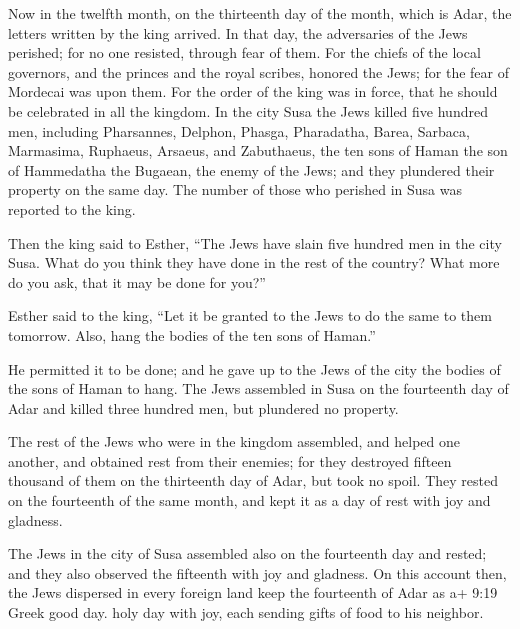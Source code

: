  Now in the twelfth month, on the thirteenth day of the
month, which is Adar, the letters written by the king arrived.
 In that day, the adversaries of the Jews perished; for no
one resisted, through fear of them.  For the chiefs of the
local governors, and the princes and the royal scribes, honored the
Jews; for the fear of Mordecai was upon them.  For the order
of the king was in force, that he should be celebrated in all the
kingdom.  In the city Susa the Jews killed five hundred men,
 including Pharsannes, Delphon, Phasga, 
Pharadatha, Barea, Sarbaca,  Marmasima, Ruphaeus, Arsaeus,
and Zabuthaeus,  the ten sons of Haman the son of
Hammedatha the Bugaean, the enemy of the Jews; and they plundered their
property on the same day.  The number of those who perished
in Susa was reported to the king.

 Then the king said to Esther, ``The Jews have slain five
hundred men in the city Susa. What do you think they have done in the
rest of the country? What more do you ask, that it may be done for
you?''

 Esther said to the king, ``Let it be granted to the Jews
to do the same to them tomorrow. Also, hang the bodies of the ten sons
of Haman.''

 He permitted it to be done; and he gave up to the Jews of
the city the bodies of the sons of Haman to hang.  The Jews
assembled in Susa on the fourteenth day of Adar and killed three hundred
men, but plundered no property.

 The rest of the Jews who were in the kingdom assembled,
and helped one another, and obtained rest from their enemies; for they
destroyed fifteen thousand of them on the thirteenth day of Adar, but
took no spoil.  They rested on the fourteenth of the same
month, and kept it as a day of rest with joy and gladness.

 The Jews in the city of Susa assembled also on the
fourteenth day and rested; and they also observed the fifteenth with joy
and gladness.  On this account then, the Jews dispersed in
every foreign land keep the fourteenth of Adar as a+ 9:19 Greek good
day. holy day with joy, each sending gifts of food to his neighbor.

